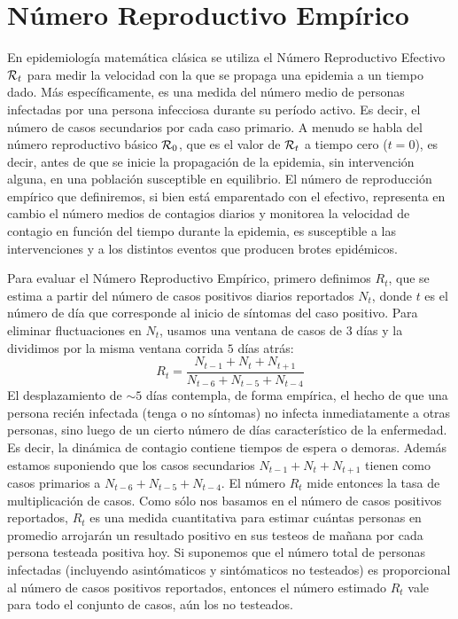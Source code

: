 \documentclass[12pt,a4paper]{article}
\begin{document}
\section*{Número Reproductivo Empírico}
En epidemiología matemática clásica se utiliza el Número Reproductivo Efectivo 
${\cal R}_t$ para medir la velocidad con la que se propaga una epidemia a un tiempo dado. 
Más específicamente, es una medida del número medio de personas infectadas por una persona 
infecciosa durante su período activo. Es decir, el número de casos secundarios por cada caso primario. 
A menudo se habla del número reproductivo básico ${\cal R}_0$, que es el valor 
de ${\cal R}_t$ a tiempo cero ($t=0$), es decir, antes de que se inicie 
la propagación de la epidemia, sin intervención alguna, en una 
población susceptible en equilibrio. El número de reproducción empírico que definiremos, 
si bien está emparentado con el efectivo, representa en cambio el número medios de 
contagios diarios y monitorea la velocidad de contagio en función del tiempo durante la epidemia, es susceptible a las intervenciones y a los distintos eventos que producen 
brotes epidémicos.


Para evaluar el Número Reproductivo Empírico, primero definimos $R_t$, que
se estima a partir del número de casos positivos diarios reportados $N_t$, 
donde $t$ es el número de día que corresponde al inicio de síntomas del caso 
positivo. Para eliminar fluctuaciones en $N_t$, usamos una 
ventana de casos de $3$ días y la dividimos por la misma ventana corrida $5$ 
días atrás:
\begin{equation}
R_t = \frac{N_{t-1}+N_{t}+N_{t+1}}{N_{t-6}+N_{t-5}+N_{t-4}}
\end{equation}
El desplazamiento de $\sim 5$ días contempla, 
de forma empírica, el hecho de que una persona recién 
infectada (tenga o no síntomas) no infecta inmediatamente a otras personas, 
sino luego de un cierto número de días característico de la enfermedad.
Es decir, la dinámica de contagio contiene tiempos de espera o demoras. 
Adem\'as estamos suponiendo que los casos secundarios 
$N_{t-1}+N_{t}+N_{t+1}$ tienen como casos primarios 
a ${N_{t-6}+N_{t-5}+N_{t-4}}$.
El número $R_t$ mide entonces 
la tasa de multiplicación de casos. Como sólo nos basamos 
en el número de casos positivos reportados, $R_t$ es una medida 
cuantitativa para estimar cuántas personas en promedio arrojarán un 
resultado positivo en sus testeos de mañana por cada 
persona testeada positiva hoy. Si suponemos que el número total 
de personas infectadas (incluyendo asintómaticos y sintómaticos no testeados) 
es proporcional al número de casos positivos reportados, entonces el número estimado
$R_t$ vale para todo el conjunto de casos, aún los no testeados.
\end{document}
